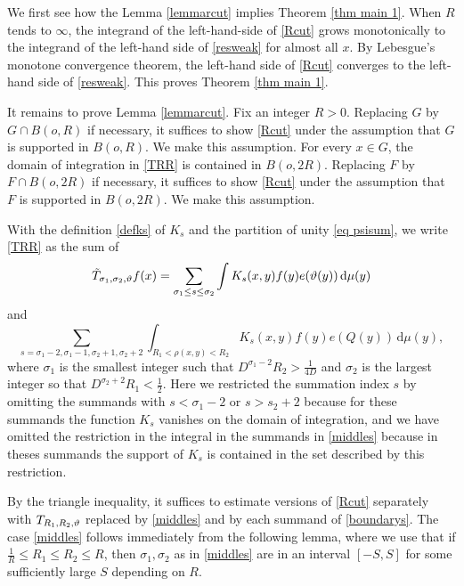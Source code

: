 We first see how the Lemma \ref{lemmarcut} implies
Theorem \ref{thm main 1}. When $R$ tends to $\infty$, the integrand of the left-hand-side of \eqref{Rcut}
grows monotonically to the integrand of the
left-hand side of \eqref{resweak} for almost all $x$.
By Lebesgue's monotone convergence theorem, the left-hand side of \eqref{Rcut} converges to the
left-hand side of \eqref{resweak}. This proves Theorem \ref{thm main 1}.

It remains to prove Lemma \ref{lemmarcut}.
Fix an integer $R>0$.  Replacing
$G$ by $G\cap B(o,R)$ if necessary, it suffices to show
\eqref{Rcut} under the assumption that $G$ is supported in $B(o,R)$. We make this assumption.
For every $x\in G$, the domain of integration
in \eqref{TRR} is contained in $B(o,2R)$.
Replacing
$F$ by $F\cap B(o,2R)$ if necessary, it suffices to show
\eqref{Rcut} under the assumption that $F$ is supported in $B(o,2R)$. We make this assumption.

With the definition \eqref{defks} of $K_s$
and the partition of unity \eqref{eq psisum}, we write \eqref{TRR} as the sum of 
\begin{equation}\label{middles}
\Tilde{T}_{\sigma_1,\sigma_2,\vartheta}f(x)=\sum_{\sigma_1 \le s\le \sigma_2}
\int K_s(x,y)  f(y) e(\vartheta(y)) \, \mathrm{d}\mu(y)
\end{equation}
and
\begin{equation}\label{boundarys}
\sum_{s=\sigma_1-2,\sigma_1-1, \sigma_2+1,\sigma_2+2}
\int_{R_1 <  \rho(x,y) < R_2}  K_s(x,y) f(y) e(Q(y)) \,
    \mathrm{d}\mu(y),
\end{equation}
where $\sigma_1$ is the smallest integer such that $D^{\sigma_1-2}R_2>\frac 1{4D}$ and $\sigma_2$
is the largest integer so that $D^{\sigma_2+2}R_1<\frac 12$. Here we restricted the summation index $s$
by omitting the summands with $s<\sigma_1-2$
or $s>s_2+2$ because for these summands the function $K_s$ vanishes on the domain of integration, and we have omitted the restriction in the integral
in the  summands in \eqref{middles} because in theses summands the support of $K_s$ is contained in
the set described by this restriction.



By the triangle inequality, it suffices to estimate
versions of \eqref{Rcut} separately with $T_{R_1,R_2,\vartheta}$ replaced by
\eqref{middles} and by each summand of \eqref{boundarys}.
The case \eqref{middles} follows immediately from the following lemma, where we use that if
$\frac 1R\le R_1\le R_2\le R$, then $\sigma_1,\sigma_2$
as in \eqref{middles} are in an interval $[-S,S]$ for some
sufficiently large $S$ depending on $R$.


